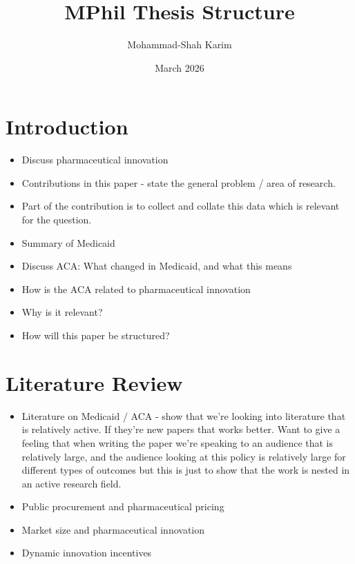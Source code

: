 \documentclass[12pt]{article}
\title{MPhil Thesis Structure}
\author{Mohammad-Shah Karim}
\date{March 2026}
\begin{document}
\maketitle

\tableofcontents

\newpage

\section{Introduction}

\begin{itemize}
    \item Discuss pharmaceutical innovation
    \item Contributions in this paper - state the general problem / area of research.
    \item Part of the contribution is to collect and collate this data which is relevant for the question.
    \item Summary of Medicaid
    \item Discuss ACA: What changed in Medicaid, and what this means
    \item How is the ACA related to pharmaceutical innovation
    \item Why is it relevant?
    \item How will this paper be structured?
\end{itemize}

\section{Literature Review}

\begin{itemize}
    \item Literature on Medicaid / ACA - show that we're looking into literature that is relatively active. If they're new papers that works better. Want to give a feeling that when writing the paper we're speaking to an audience that is relatively large, and the audience looking at this policy is relatively large for different types of outcomes but this is just to show that the work is nested in an active research field.
    \item Public procurement and pharmaceutical pricing
    \item Market size and pharmaceutical innovation
    \item Dynamic innovation incentives
\end{itemize}
\end{document}
